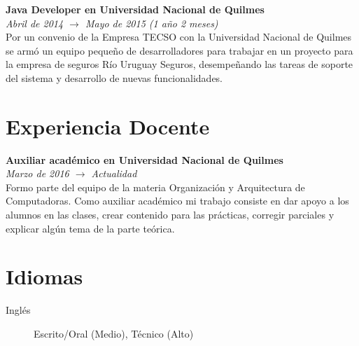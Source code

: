 \documentclass[margin, line, a4paper]{resume}
\begin{document}
\begin{resume}
      \textbf{Java Developer en Universidad Nacional de Quilmes} \\
      \textit{Abril de 2014 $\rightarrow$ Mayo de 2015 (1 año 2 meses)} \\
      Por un convenio de la Empresa TECSO con la Universidad Nacional de Quilmes se armó un equipo pequeño de desarrolladores para trabajar en un proyecto para la empresa de seguros Río Uruguay Seguros, desempeñando las tareas de soporte del sistema y desarrollo de nuevas funcionalidades.

    \section{\mysidestyle Experiencia Docente}\vspace{1mm}
      \textbf{Auxiliar académico en Universidad Nacional de Quilmes} \\
      \textit{Marzo de 2016 $\rightarrow$ Actualidad} \\
      Formo parte del equipo de la materia Organización y Arquitectura de Computadoras. Como auxiliar académico mi trabajo consiste en dar apoyo a los alumnos en las clases, crear contenido para las prácticas, corregir parciales y explicar algún tema de la parte teórica.

    \section{\mysidestyle Idiomas}
      \begin{description}
        \item[Inglés] Escrito/Oral (Medio), Técnico (Alto)
      \end{description}
  
  \end{resume}
\end{document}
